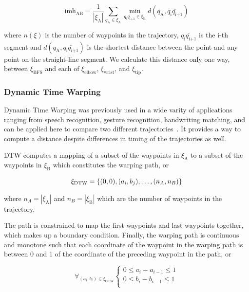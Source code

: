 \documentclass[letterpaper, 10 pt, conference]{ieeeconf}  %
\newcommand{\tj}[1]{\ensuremath{\xi_\text{#1}}}
\begin{document}
\begin{equation}
\text{imh}_\text{AB} = \frac{1}{|\xi_\text{A}|} \sum_{q_\text{A} \in \xi_\text{A}} \min_{\overline{q_\text{i}q_\text{i+1}} \in \xi_\text{B}} d(q_\text{A}, \overline{q_\text{i}q_\text{i+1}})
\end{equation}

where $n(\xi)$ is the number of waypoints in the trajectory, $\overline{q_\text{i}q_\text{i+1}}$ is the i-th segment and $d(q_\text{A}, \overline{q_\text{i}q_\text{i+1}})$ is the shortest distance between the point and any point on the straight-line segment. We calculate this distance only one way, between $\xi_{\text{BFS}}$ and each of $\xi_\text{elbow}$, $\xi_\text{wrist}$, and $\xi_\text{tip}$.

\subsubsection{Dynamic Time Warping}

Dynamic Time Warping was previously used in a wide varity of applications ranging from speech recognition, gesture recognition, handwriting matching, and can be applied here to compare two different trajectories~\cite{senin2008dynamic}\cite{chen2013dynamic}. It provides a way to compute a distance despite differences in timing of the trajectories as well.

DTW computes a mapping of a subset of the waypoints in $\xi_\text{A}$ to a subset of the waypoints in $\xi_\text{B}$ which constitutes the warping path, or

\begin{equation}
\xi_\text{DTW} = \{ (0, 0), (a_i, b_j), \mathellipsis ,(n_A, n_B) \}
\end{equation}

where $n_A = |\tj{A}|$ and $n_B = |\tj{B}|$ which are the number of waypoints in the trajectory.

The path is constrained to map the first waypoints and last waypoints together, which makes up a boundary condition. Finally, the warping path is continuous and monotone such that each coordinate of the waypoint in the warping path is between 0 and 1 of the coordinate of the preceding waypoint in the path, or

\begin{equation}
\forall_{(a_i,b_i) \in \xi_\text{DTW}} 
  \begin{cases}
      0 \leq a_{i} - a_{i-1} \leq 1 \\
      0 \leq b_{i} - b_{i-1} \leq 1 \\
  \end{cases}
\end{equation}
\end{document}
